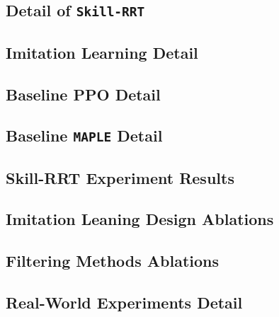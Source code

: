 \subsection{Detail of \texttt{Skill-RRT}}\label{Appendix:Skill-RRT Details}



\subsection{Imitation Learning Detail}
\label{Appendix:imitation_learning}



\subsection{Baseline PPO Detail}\label{Appendix:baseline_PPO}


\subsection{Baseline \texttt{MAPLE} Detail}\label{Appendix:baseline_MAPLE}


\subsection{Skill-RRT Experiment Results}\label{Appendix:skill_rrt_planning_time}


\subsection{Imitation Leaning Design Ablations}
\label{Appendix:IL_ablation}

\subsection{Filtering Methods Ablations}
\label{Appendix:data_qual}

\subsection{Real-World Experiments Detail}
\label{Appendix:real_exp}